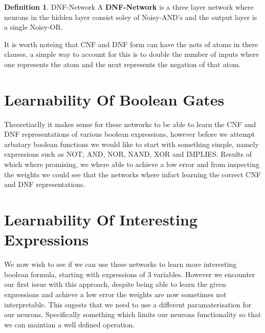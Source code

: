 \documentclass{article}
\theoremstyle{definition}
\newtheorem{definition}{Definition}[section]
\begin{document}
\theoremstyle{definition}
\begin{definition}{DNF-Network}
A \textbf{DNF-Network} is a three layer network where neurons in the hidden layer consist soley of Noisy-AND's and the output layer is a single Noisy-OR. 
\end{definition}

It is worth noteing that CNF and DNF form can have the nots of atoms in there clauses, a simple way to account for this is to double the number of inputs where one represents the atom and the next represents the negation of that atom.


\section{Learnability Of Boolean Gates}
Theoretiaclly it makes sense for these networks to be able to learn the CNF and DNF representations of various boolean expressions, however before we attempt arbatary boolean functions we would like to start with something simple, namely expressions such as NOT, AND, NOR, NAND, XOR and IMPLIES. Results of which where promising, we where able to achieve a low error and from inspecting the weights we could see that the networks where infact learning the correct CNF and DNF representations.\\

\section{Learnability Of Interesting Expressions}
We now wish to see if we can use these networks to learn more interesting boolean formula, starting with expressions of 3 variables. However we encounter our first issue with this approach, despite being able to learn the given expressions and achieve a low error the weights are now sometimes not interpretable. This sugests that we need to use a different paramaterisation for our neurons. Specifically something which limits our neurons functionality so that we can maintian a well defined operation.

\medskip


\end{document}
